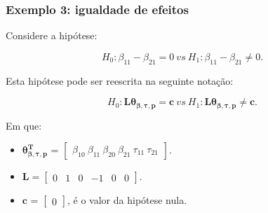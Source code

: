 \documentclass[10pt,
  aspectratio=169,
  serif,
  mathserif,
  professionalfont,
  compress,
  handout,
  ]{beamer}\usepackage[]{graphicx}\usepackage[]{color}
\begin{document}
\begin{frame}

\frametitle{Exemplo 3: igualdade de efeitos}

Considere a hipótese:

$$H_0: \beta_{11} - \beta_{21} = 0 \ vs \ H_1: \beta_{11} - \beta_{21} \neq 0.$$

Esta hipótese pode ser reescrita na seguinte notação:

$$H_0: \boldsymbol{L}\boldsymbol{\theta_{\beta,\tau,p}} = \boldsymbol{c} \ vs \ H_1: \boldsymbol{L}\boldsymbol{\theta_{\beta,\tau,p}} \neq \boldsymbol{c}.$$ 

Em que:

\begin{itemize}
  
  \item $\boldsymbol{\theta_{\beta,\tau,p}^T}$ = $\begin{bmatrix} \beta_{10} \  \beta_{11} \ \beta_{20} \ \beta_{21} \ \tau_{11} \ \tau_{21} \end{bmatrix}$.


\item $\boldsymbol{L} = \begin{bmatrix} 0 & 1 & 0 & -1 & 0 & 0  \end{bmatrix}.$
 
\item $\boldsymbol{c}$ = $\begin{bmatrix} 0 \end{bmatrix}$, é o valor da hipótese nula. 

\end{itemize}

\end{frame}

\end{document}

